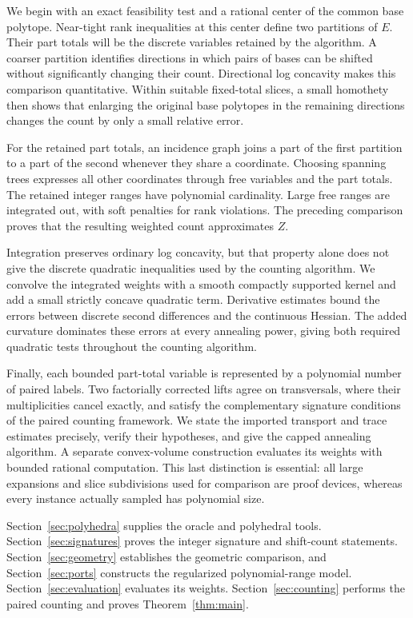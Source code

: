 We begin with an exact feasibility test and a rational center of the
common base polytope. Near-tight rank inequalities at this center define
two partitions of $E$. Their part totals will be the discrete variables
retained by the algorithm. A coarser partition identifies directions in
which pairs of bases can be shifted without significantly changing their
count. Directional log concavity makes this comparison quantitative.
Within suitable fixed-total slices, a small homothety then shows that
enlarging the original base polytopes in the remaining directions changes
the count by only a small relative error.

For the retained part totals, an incidence graph joins a part of the
first partition to a part of the second whenever they share a coordinate.
Choosing spanning trees expresses all other coordinates through free
variables and the part totals. The retained integer ranges have polynomial
cardinality. Large free ranges are integrated out, with soft penalties
for rank violations. The preceding comparison proves that the resulting
weighted count approximates $Z$.

Integration preserves ordinary log concavity, but that property alone
does not give the discrete quadratic inequalities used by the counting
algorithm. We convolve the integrated weights with a smooth compactly
supported kernel and add a small strictly concave quadratic term.
Derivative estimates bound the errors between discrete second differences
and the continuous Hessian. The added curvature dominates these errors
at every annealing power, giving both required quadratic tests throughout
the counting algorithm.

Finally, each bounded part-total variable is represented by a polynomial
number of paired labels. Two factorially corrected lifts agree on
transversals, where their multiplicities cancel exactly, and satisfy the
complementary signature conditions of the paired counting framework.
We state the imported transport and trace estimates precisely, verify
their hypotheses, and give the capped annealing algorithm. A separate
convex-volume construction evaluates its weights with bounded rational
computation. This last distinction is essential: all large expansions and
slice subdivisions used for comparison are proof devices, whereas every
instance actually sampled has polynomial size.

Section~\ref{sec:polyhedra} supplies the oracle and polyhedral tools.
Section~\ref{sec:signatures} proves the integer signature and shift-count
statements. Section~\ref{sec:geometry} establishes the geometric
comparison, and Section~\ref{sec:ports} constructs the regularized
polynomial-range model. Section~\ref{sec:evaluation} evaluates its
weights. Section~\ref{sec:counting} performs the paired counting and
proves Theorem~\ref{thm:main}.

